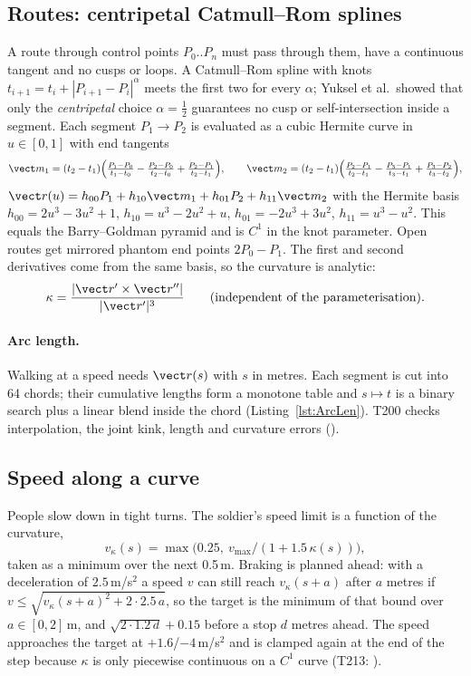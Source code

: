 \subsection{Routes: centripetal Catmull--Rom splines}
A route through control points $P_0..P_n$ must pass through them, have a continuous tangent and no cusps or loops. A Catmull--Rom spline with knots $t_{i+1}=t_i+|P_{i+1}-P_i|^\alpha$ meets the first two for every $\alpha$; Yuksel et al.\ showed that only the \emph{centripetal} choice $\alpha=\tfrac12$ guarantees no cusp or self-intersection inside a segment. Each segment $P_1\to P_2$ is evaluated as a cubic Hermite curve in $u\in[0,1]$ with end tangents
\begin{equation}
\vect m_1=(t_2-t_1)\Bigl(\tfrac{P_1-P_0}{t_1-t_0}-\tfrac{P_2-P_0}{t_2-t_0}+\tfrac{P_2-P_1}{t_2-t_1}\Bigr),\qquad
\vect m_2=(t_2-t_1)\Bigl(\tfrac{P_2-P_1}{t_2-t_1}-\tfrac{P_3-P_1}{t_3-t_1}+\tfrac{P_3-P_2}{t_3-t_2}\Bigr),
\end{equation}
$\vect r(u)=h_{00}P_1+h_{10}\vect m_1+h_{01}P_2+h_{11}\vect m_2$ with the Hermite basis $h_{00}=2u^3-3u^2+1$, $h_{10}=u^3-2u^2+u$, $h_{01}=-2u^3+3u^2$, $h_{11}=u^3-u^2$. This equals the Barry--Goldman pyramid and is $C^1$ in the knot parameter. Open routes get mirrored phantom end points $2P_0-P_1$. The first and second derivatives come from the same basis, so the curvature is analytic:
\begin{equation}\kappa=\frac{|\vect r'\times\vect r''|}{|\vect r'|^3}\qquad\text{(independent of the parameterisation).}\end{equation}
\lstSplineSeg
\paragraph{Arc length.} Walking at a speed needs $\vect r(s)$ with $s$ in metres. Each segment is cut into 64 chords; their cumulative lengths form a monotone table and $s\mapsto t$ is a binary search plus a linear blend inside the chord (Listing~\ref{lst:ArcLen}). T200 checks interpolation, the joint kink, length and curvature errors ().
\lstArcLen

\subsection{Speed along a curve}
People slow down in tight turns. The soldier's speed limit is a function of the curvature,
\begin{equation}v_\kappa(s)=\max\bigl(0.25,\ v_\text{max}/(1+1.5\,\kappa(s))\bigr),\end{equation}
taken as a minimum over the next 0.5\,m. Braking is planned ahead: with a deceleration of $2.5$\,m/s$^2$ a speed $v$ can still reach $v_\kappa(s+a)$ after $a$ metres if $v\le\sqrt{v_\kappa(s+a)^2+2\cdot2.5\,a}$, so the target is the minimum of that bound over $a\in[0,2]$\,m, and $\sqrt{2\cdot1.2\,d}+0.15$ before a stop $d$ metres ahead. The speed approaches the target at $+1.6$/$-4$\,m/s$^2$ and is clamped again at the end of the step because $\kappa$ is only piecewise continuous on a $C^1$ curve (T213: ).
\lstSpeedLaw

